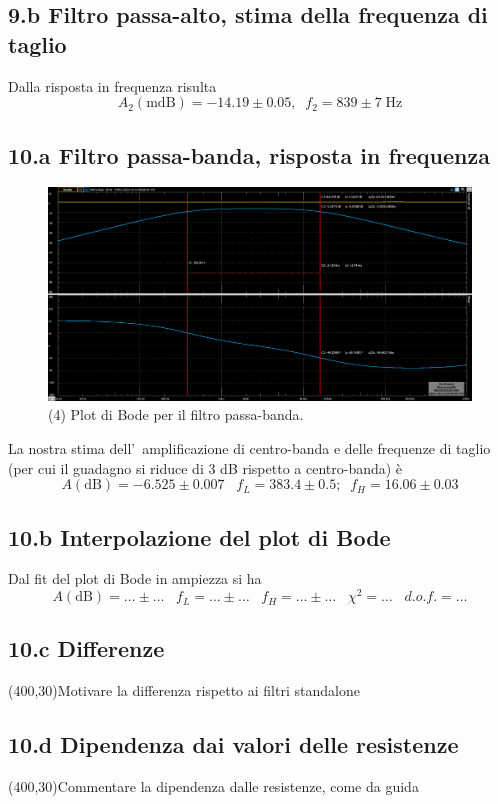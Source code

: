 \documentclass[10pt,a4paper]{article}
\begin{document}
\subsection*{9.b Filtro passa-alto, stima della frequenza di taglio}
Dalla risposta in frequenza risulta
\[
A_2(\mathrm{mdB}) = -14.19 \pm 0.05, \;\; f_2 = 839 \pm 7 \; \si{\Hz}
\]

\subsection*{10.a Filtro passa-banda, risposta in frequenza}
\begin{figure}[h]
\centering
\includegraphics[scale=0.35]{rc2k10nbpf}
\caption{(4) Plot di Bode per il filtro passa-banda.}
\end{figure}
La nostra stima dell'~amplificazione di centro-banda e delle frequenze di 
taglio (per cui il guadagno si riduce di 3 dB rispetto a centro-banda) \`e
\[
A(\mathrm{dB}) = -6.525 \pm 0.007 \;\;\;f_{L} = 383.4 \pm 0.5 ;\;\; f_{H} = 16.06 \pm 0.03
\]

\subsection*{10.b Interpolazione del plot di Bode}
Dal fit del plot di Bode in ampiezza si ha
\[
A(\mathrm{dB}) = \ldots \pm \ldots \;\;\;f_{L} = \ldots\pm \ldots\;\;\;f_{H} = \ldots\pm 
\ldots\;\;\;\chi^2 = \ldots\;\;\; d.o.f.= \ldots
\]
\subsection*{10.c Differenze}
\vspace{0.5cm}
\framebox(400,30){Motivare la differenza rispetto ai filtri standalone}

\subsection*{10.d Dipendenza dai valori delle resistenze}
\vspace{0.5cm}
\framebox(400,30){Commentare la dipendenza dalle resistenze, come da guida}
\end{document}
